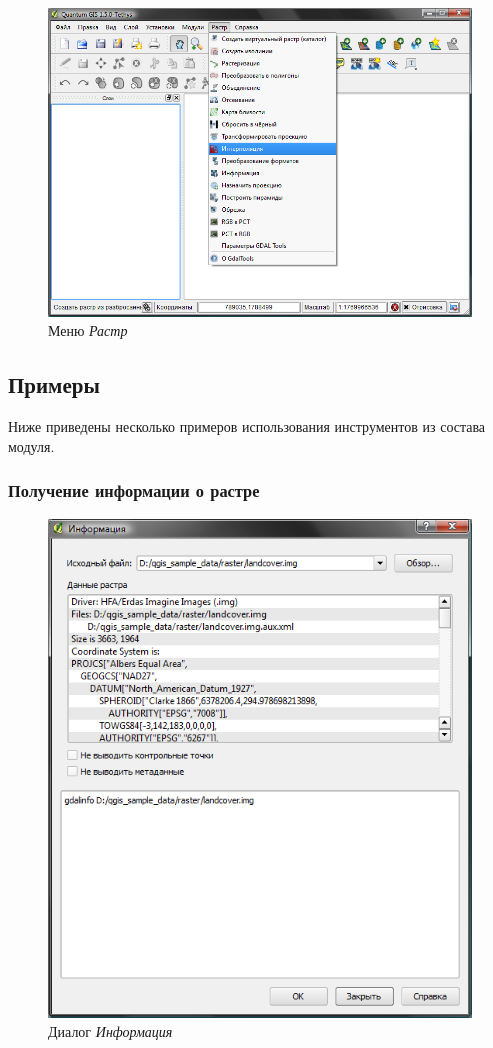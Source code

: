 {\begin{figure}[ht]
   \centering
   \includegraphics[clip=true, width=12cm]{plugins_gdaltools_images/raster_menu}
   \caption{\label{gdaltools_menu}Меню \emph{Растр} \wincaption}
\end{figure}

\subsection{Примеры}\label{gdal_examples}
Ниже приведены несколько примеров использования инструментов из состава модуля.
\subsubsection{Получение информации о растре}
\begin{figure}[ht]
   \centering
   \includegraphics[clip=true, width=12cm]{plugins_gdaltools_images/gdalinfo}
   \caption{\label{gdalinfo}Диалог \emph{Информация} \wincaption}
\end{figure}

}

